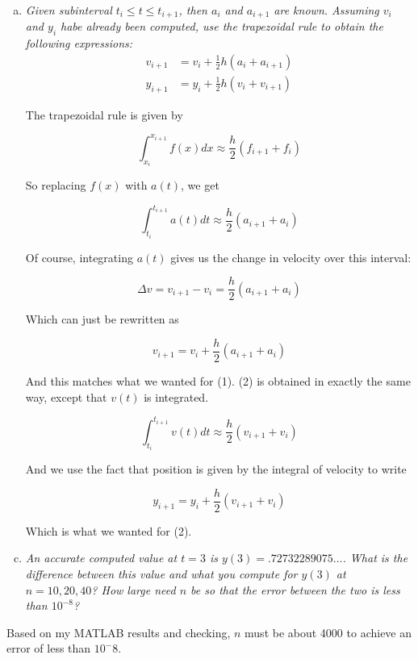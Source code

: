 \documentclass{article}
\begin{document}
\begin{enumerate}[(a)]
  \item \textit{Given subinterval $t_i \leq t \leq t_{i+1}$, then $a_i$ and $a_{i+1}$ are known. Assuming $v_i$ and $y_i$ habe already been computed, use the trapezoidal rule to obtain the following expressions:}
    \begin{align}
      v_{i+1} &= v_i + \frac{1}{2}h(a_i + a_{i+1}) \\
      y_{i+1} &= y_i + \frac{1}{2}h(v_i + v_{i+1}) 
    \end{align}

    The trapezoidal rule is given by 

    $$\int_{x_i}^{x_{i+1}} f(x)dx \approx \frac{h}{2} (f_{i+1} + f_i)$$

    So replacing $f(x)$ with $a(t)$, we get 

    $$\int_{t_i}^{t_{i+1}} a(t)dt \approx \frac{h}{2} (a_{i+1} + a_i)$$

    Of course, integrating $a(t)$ gives us the change in velocity over this interval:

    $$\Delta v = v_{i+1} - v_i = \frac{h}{2} (a_{i+1} + a_i)$$

    Which can just be rewritten as

    $$v_{i+1} = v_i + \frac{h}{2} (a_{i+1} + a_i)$$

    And this matches what we wanted for (1). (2) is obtained in exactly the same way, except that $v(t)$ is integrated.
    
    $$\int_{t_i}^{t_{i+1}} v(t)dt \approx \frac{h}{2} (v_{i+1} + v_i)$$

    And we use the fact that position is given by the integral of velocity to write

    $$y_{i+1} = y_i + \frac{h}{2} (v_{i+1} + v_i)$$

    Which is what we wanted for (2).

\end{enumerate}
\begin{enumerate}[(a)]\setcounter{enumi}{2}
  \item \textit{An accurate computed value at $t = 3$ is $y(3) = .72732289075\dots$. What is the difference between this value and what you compute for $y(3)$ at $n = 10, 20, 40$? How large need $n$ be so that the error between the two is less than $10^{-8}$?}
\end{enumerate}

Based on my MATLAB results and checking, $n$ must be about 4000 to achieve an error of less than $10^-8$. 
\end{document}
